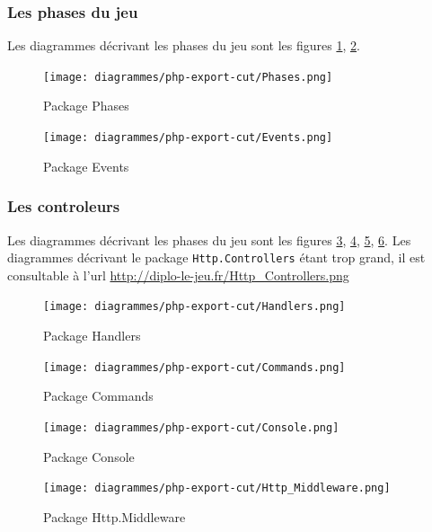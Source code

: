         \newpage
        \subsubsection{Les phases du jeu}
        Les diagrammes décrivant les phases du jeu sont les figures \ref{pphases}, \ref{pevents}.

			\begin{figure}[!h]
				\centering
                \texttt{[image: diagrammes/php-export-cut/Phases.png]}
                \caption{\label{pphases}Package Phases}
			\end{figure}

			\begin{figure}[!h]
				\centering
                \texttt{[image: diagrammes/php-export-cut/Events.png]}
                \caption{\label{pevents}Package Events}
			\end{figure}
        
        \newpage
        \subsubsection{Les controleurs}
        Les diagrammes décrivant les phases du jeu sont les figures \ref{phandlers}, \ref{pcommands}, \ref{pconsole}, \ref{phmiddleware}.
        Les diagrammes décrivant le package \verb|Http.Controllers| étant trop grand, il est consultable à l'url \url{http://diplo-le-jeu.fr/Http\_Controllers.png}

			\begin{figure}[!h]
				\centering
                \texttt{[image: diagrammes/php-export-cut/Handlers.png]}
                \caption{\label{phandlers}Package Handlers}
			\end{figure}

			\begin{figure}[!h]
				\centering
                \texttt{[image: diagrammes/php-export-cut/Commands.png]}
                \caption{\label{pcommands}Package Commands}
			\end{figure}

			\begin{figure}[!h]
				\centering
                \texttt{[image: diagrammes/php-export-cut/Console.png]}
                \caption{\label{pconsole}Package Console}
			\end{figure}

			\begin{figure}[!h]
				\centering
                \texttt{[image: diagrammes/php-export-cut/Http\_Middleware.png]}
                \caption{\label{phmiddleware}Package Http.Middleware}
			\end{figure}

